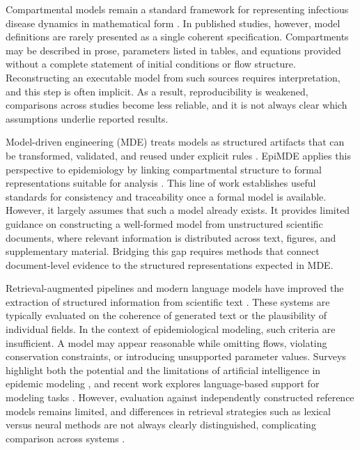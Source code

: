 \documentclass[a4paper,12pt]{article}
\begin{document}
Compartmental models remain a standard framework for representing infectious disease dynamics in mathematical form \citep{keeling2008modeling}. In published studies, however, model definitions are rarely presented as a single coherent specification. Compartments may be described in prose, parameters listed in tables, and equations provided without a complete statement of initial conditions or flow structure. Reconstructing an executable model from such sources requires interpretation, and this step is often implicit. As a result, reproducibility is weakened, comparisons across studies become less reliable, and it is not always clear which assumptions underlie reported results.

Model-driven engineering (MDE) treats models as structured artifacts that can be transformed, validated, and reused under explicit rules \citep{brambilla2012model}. EpiMDE applies this perspective to epidemiology by linking compartmental structure to formal representations suitable for analysis \citep{epimde2024}. This line of work establishes useful standards for consistency and traceability once a formal model is available. However, it largely assumes that such a model already exists. It provides limited guidance on constructing a well-formed model from unstructured scientific documents, where relevant information is distributed across text, figures, and supplementary material. Bridging this gap requires methods that connect document-level evidence to the structured representations expected in MDE.

Retrieval-augmented pipelines and modern language models have improved the extraction of structured information from scientific text \citep{lewis2020retrieval,achiam2023gpt4,team2024gemini,anthropic2024claude}. These systems are typically evaluated on the coherence of generated text or the plausibility of individual fields. In the context of epidemiological modeling, such criteria are insufficient. A model may appear reasonable while omitting flows, violating conservation constraints, or introducing unsupported parameter values. Surveys highlight both the potential and the limitations of artificial intelligence in epidemic modeling \citep{Kraemer2025AI_epidemics,KWOK20243254,Matthay2025}, and recent work explores language-based support for modeling tasks \citep{11344468,wibaek2023llm_epidemiology}. However, evaluation against independently constructed reference models remains limited, and differences in retrieval strategies such as lexical versus neural methods are not always clearly distinguished, complicating comparison across systems \citep{lewis2020retrieval}.
\end{document}
